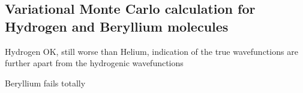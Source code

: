 \subsection{Variational Monte Carlo calculation for Hydrogen and Beryllium molecules}
	Hydrogen OK, still worse than Helium, indication of the true wavefunctions are further apart from the hydrogenic wavefunctions
	
	Beryllium fails totally
